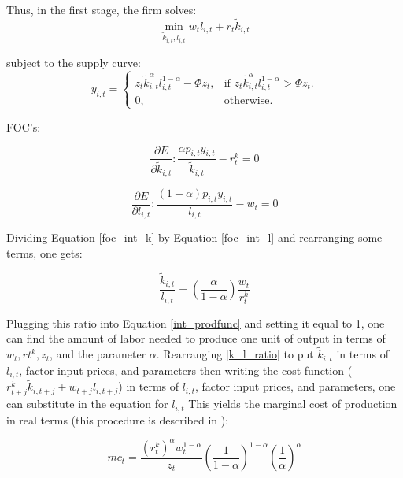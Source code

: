 \documentclass[article,11pt,letterpaper,fleqn]{article}
\theoremstyle{definition}
\numberwithin{equation}{section}
\newcommand{\cn}{\citeasnoun} %
\begin{document}
Thus, in the first stage, the firm solves:
\begin{equation}
\min_{\tilde{k}_{i,t},l_{i,t}} w_{t}l_{i,t} + r_{t}\tilde{k}_{i,t}
\end{equation}

subject to the supply curve: 
\begin{equation}
y_{i,t}=\begin{cases}
    z_{t}\tilde{k}_{i,t}^{\alpha}l_{i,t}^{1-\alpha} - \Phi z_{t}, & \text{if $z_{t}\tilde{k}_{i,t}^{\alpha}l_{i,t}^{1-\alpha}>\Phi z_{t}$}.\\
    0, & \text{otherwise}.
  \end{cases}
\end{equation}

FOC's:

\begin{equation}
\label{foc_int_k}
\frac{\partial E}{\partial \tilde{k}_{i,t}}:\frac{\alpha p_{i,t}y_{i,t}}{\tilde{k}_{i,t}}-r_{t}^{k}=0
\end{equation}

\begin{equation}
\label{foc_int_l}
\frac{\partial E}{\partial l_{i,t}}:\frac{(1-\alpha) p_{i,t}y_{i,t}}{l_{i,t}}-w_{t}=0
\end{equation}

Dividing Equation \ref{foc_int_k} by Equation \ref{foc_int_l} and rearranging some terms, one gets:

\begin{equation}
\label{k_l_ratio}
\frac{\tilde{k}_{i,t}}{l_{i,t}}=\left(\frac{\alpha}{1-\alpha}\right)\frac{w_{t}}{r_{t}^{k}}
\end{equation}


Plugging this ratio into Equation \ref{int_prodfunc} and setting it equal to 1, one can find the amount of labor needed to produce one unit of output in terms of $w_{t}, r{t}^{k}, z_{t}$, and the parameter $\alpha$.  Rearranging \ref{k_l_ratio} to put $\tilde{k}_{i,t}$ in terms of $l_{i,t}$, factor input prices, and parameters then writing the cost function ($r_{t+j}^{k}\tilde{k}_{i,t+j}+w_{t+j}l_{i,t+j}$) in terms of $l_{i,t}$, factor input prices, and parameters, one can substitute in the equation for $l_{i,t}$ This yields the marginal cost of production in real terms (this procedure is described in \cn{FVRR2006}):

\begin{equation}
\label{marg_cost}
mc_{t}=\frac{(r^{k}_{t})^{\alpha}w_{t}^{1-\alpha}}{z_{t}}\left(\frac{1}{1-\alpha}\right)^{1-\alpha}\left(\frac{1}{\alpha}\right)^{\alpha}
\end{equation}
\end{document}
